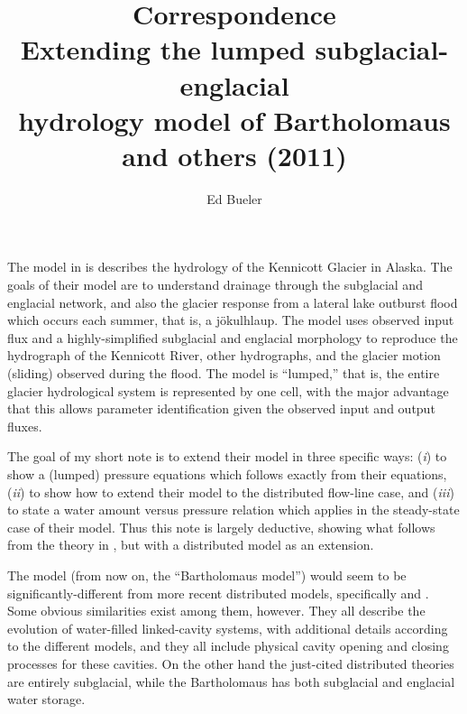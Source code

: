 \documentclass[review,letterpaper]{igs}
\begin{document}
\title[Extending the Bartholomaus hydrology model]{Correspondence \\ Extending the lumped subglacial-englacial \\ hydrology model of Bartholomaus and others (2011)}

\author{Ed Bueler}



\maketitle

The model in \cite{Bartholomausetal2011} is describes the hydrology of the Kennicott Glacier in Alaska.  The goals of their model are to understand drainage through the subglacial and englacial network, and also the glacier response from a lateral lake outburst flood which occurs each summer, that is, a j\"okulhlaup.  The model uses observed input flux and a highly-simplified subglacial and englacial morphology to reproduce the hydrograph of the Kennicott River, other hydrographs, and the glacier motion (sliding) observed during the flood.  The model is ``lumped,'' that is, the entire glacier hydrological system is represented by one cell, with the major advantage that this allows parameter identification given the observed input and output fluxes.

The goal of my short note is to extend their model in three specific ways: (\emph{i}) to show a (lumped) pressure equations which follows exactly from their equations, (\emph{ii}) to show how to extend their model to the distributed flow-line case, and (\emph{iii}) to state a water amount versus pressure relation which applies in the steady-state case of their model.  Thus this note is largely deductive, showing what follows from the theory in \cite{Bartholomausetal2011}, but with a distributed model as an extension.

The \cite{Bartholomausetal2011} model (from now on, the ``Bartholomaus model'') would seem to be significantly-different from more recent distributed models, specifically \cite{Schoofetal2012} and \cite{Hewittetal2012}.  Some obvious similarities exist among them, however.  They all describe the evolution of water-filled linked-cavity systems, with additional details according to the different models, and they all include physical cavity opening and closing processes for these cavities.  On the other hand the just-cited distributed theories are entirely subglacial, while the Bartholomaus has both subglacial and englacial water storage.  
\end{document}
